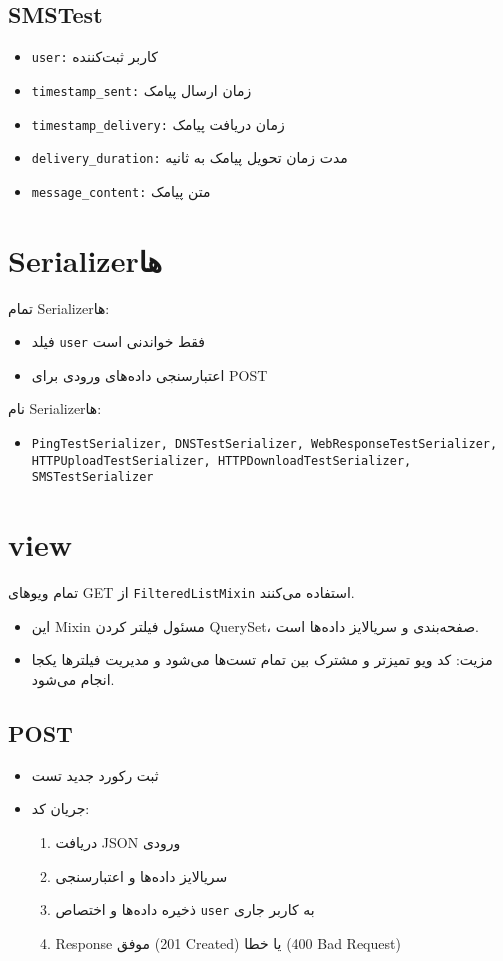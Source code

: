 \documentclass{report}
\begin{document}
\subsection{SMSTest}
\begin{itemize}
    \item \texttt{user:} کاربر ثبت‌کننده
    \item \texttt{timestamp\_sent:} زمان ارسال پیامک
    \item \texttt{timestamp\_delivery:} زمان دریافت پیامک
    \item \texttt{delivery\_duration:} مدت زمان تحویل پیامک به ثانیه
    \item \texttt{message\_content:} متن پیامک
\end{itemize}

\section{Serializerها}
تمام Serializerها:
\begin{itemize}
    \item فیلد \texttt{user} فقط خواندنی است
    \item اعتبارسنجی داده‌های ورودی برای POST
\end{itemize}

نام Serializerها:
\begin{itemize}
    \item \texttt{PingTestSerializer, DNSTestSerializer, WebResponseTestSerializer, HTTPUploadTestSerializer, HTTPDownloadTestSerializer, SMSTestSerializer}
\end{itemize}

\section{view}

تمام ویوهای GET از \texttt{FilteredListMixin} استفاده می‌کنند.
\begin{itemize}
    \item این Mixin مسئول فیلتر کردن QuerySet، صفحه‌بندی و سریالایز داده‌ها است.
    \item مزیت: کد ویو تمیزتر و مشترک بین تمام تست‌ها می‌شود و مدیریت فیلترها یکجا انجام می‌شود.
\end{itemize}

\subsection{POST}
\begin{itemize}
    \item ثبت رکورد جدید تست
    \item جریان کد:
    \begin{enumerate}
        \item دریافت JSON ورودی
        \item سریالایز داده‌ها و اعتبارسنجی
        \item ذخیره داده‌ها و اختصاص \texttt{user} به کاربر جاری
        \item Response موفق (201 Created) یا خطا (400 Bad Request)
    \end{enumerate}
\end{itemize}
\end{document}

